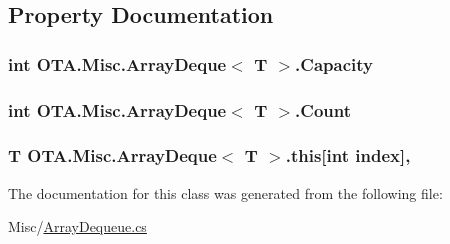 \subsection{Property Documentation}
\hypertarget{class_o_t_a_1_1_misc_1_1_array_deque_ad0fff6ac1df3b6f0a5f7ca5e09439a98}{}
\subsubsection[{Capacity}]{\setlength{\rightskip}{0pt plus 5cm}int {\bf O\+T\+A.\+Misc.\+Array\+Deque}$<$ T $>$.Capacity\hspace{0.3cm}{\ttfamily [get]}}\label{class_o_t_a_1_1_misc_1_1_array_deque_ad0fff6ac1df3b6f0a5f7ca5e09439a98}
\hypertarget{class_o_t_a_1_1_misc_1_1_array_deque_a5d91dba7a60f6e98e2d25a3f8314e8b7}{}
\subsubsection[{Count}]{\setlength{\rightskip}{0pt plus 5cm}int {\bf O\+T\+A.\+Misc.\+Array\+Deque}$<$ T $>$.Count\hspace{0.3cm}{\ttfamily [get]}}\label{class_o_t_a_1_1_misc_1_1_array_deque_a5d91dba7a60f6e98e2d25a3f8314e8b7}
\hypertarget{class_o_t_a_1_1_misc_1_1_array_deque_aca289355d8d933a2288809eed9d90e51}{}
\subsubsection[{this[int index]}]{\setlength{\rightskip}{0pt plus 5cm}T {\bf O\+T\+A.\+Misc.\+Array\+Deque}$<$ T $>$.this\mbox{[}int index\mbox{]}\hspace{0.3cm}{\ttfamily [get]}, {\ttfamily [set]}}\label{class_o_t_a_1_1_misc_1_1_array_deque_aca289355d8d933a2288809eed9d90e51}


The documentation for this class was generated from the following file\+:\begin{DoxyCompactItemize}
\item 
Misc/\hyperlink{_array_dequeue_8cs}{Array\+Dequeue.\+cs}\end{DoxyCompactItemize}
